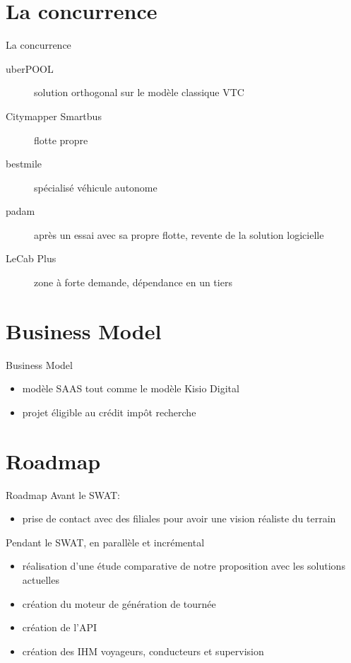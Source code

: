 \documentclass[table]{beamer}
\begin{document}
\section{La concurrence}

\begin{frame}{La concurrence}

  \begin{description}
  \item[uberPOOL] solution orthogonal sur le
    modèle classique VTC
  \item[Citymapper Smartbus] flotte propre
  \item[bestmile] spécialisé véhicule autonome
  \item[padam] après un essai avec sa propre flotte, revente de la
    solution logicielle
  \item[LeCab Plus] zone à forte demande, dépendance en un tiers
  \end{description}
\end{frame}

\section{Business Model}

\begin{frame}{Business Model}
  \begin{itemize}
  \item modèle SAAS tout comme le modèle Kisio Digital
  \item projet éligible au crédit impôt recherche
  \end{itemize}
\end{frame}

\section{Roadmap}

\begin{frame}{Roadmap}
  Avant le SWAT:
  \begin{itemize}
  \item prise de contact avec des filiales pour avoir une vision
    réaliste du terrain
  \end{itemize}

  Pendant le SWAT, en parallèle et incrémental
  \begin{itemize}
  \item réalisation d'une étude comparative de notre proposition avec
    les solutions actuelles
  \item création du moteur de génération de tournée
  \item création de l'API
  \item création des IHM voyageurs, conducteurs et supervision
  \end{itemize}
\end{frame}
\end{document}
